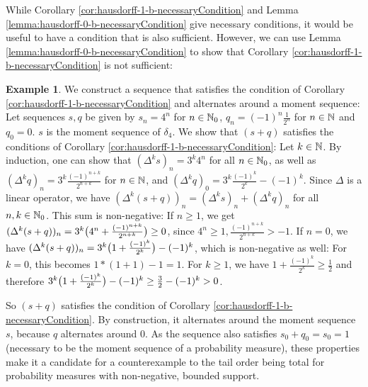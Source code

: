 \documentclass[a4paper,DIV=11]{scrreprt}
\theoremstyle{definition}
\newtheorem{ex}[thm]{Example} %
\begin{document}
    While Corollary \ref{cor:hausdorff-1-b-necessaryCondition} and Lemma \ref{lemma:hausdorff-0-b-necessaryCondition} give necessary conditions, it would be useful to have a condition that is also sufficient. However, we can use Lemma \ref{lemma:hausdorff-0-b-necessaryCondition} to show that Corollary \ref{cor:hausdorff-1-b-necessaryCondition} is not sufficient:
    
    \begin{ex}
        We construct a sequence that satisfies the condition of Corollary \ref{cor:hausdorff-1-b-necessaryCondition} and alternates around a moment sequence:
        Let sequences $s, q$ be given by $s_n = 4^n$ for $n \in \mathbb{N}_0$, $q_n = (-1)^n\frac{1}{2^n}$ for $n \in \mathbb{N}$ and $q_0 = 0$. $s$ is the moment sequence of $\delta_4$. We show that $(s + q)$ satisfies the conditions of Corollary \ref{cor:hausdorff-1-b-necessaryCondition}:
        Let $k \in \mathbb{N}$.
        By induction, one can show that $(\Delta^k s)_n = 3^k 4^n$ for all $n \in \mathbb{N}_0$, as well as $(\Delta^k q)_n = 3^k\frac{(-1)^{n+k}}{2^{n+k}}$ for $n \in \mathbb{N}$, and $(\Delta^k q)_0 = 3^k \frac{(-1)^k}{2^k} - (-1)^k$.
        Since $\Delta$ is a linear operator, we have ${(\Delta^k (s+q))_n} = {(\Delta^k s)_n + (\Delta^k q)_n}$ for all $n, k \in \mathbb{N}_0$. This sum is non-negative:
        If $n \geq 1$, we get $(\Delta^k (s+q))_n = 3^k\bigl(4^n + \frac{(-1)^{n+k}}{2^{n+k}}\bigr) \geq 0$, since $4^n \geq 1, \frac{(-1)^{n+k}}{2^{n+k}} > -1$.
        If $n = 0$, we have ${(\Delta^k (s+q))_n} = {3^k\bigl(1 + \frac{(-1)^{k}}{2^{k}}\bigr) - (-1)^k}$, which is non-negative as well:
        For $k = 0$, this becomes ${1*(1 + 1) - 1 = 1}$.
        For $k \geq 1$, we have $1 + \frac{(-1)^{k}}{2^{k}} \geq \frac{1}{2}$ and therefore $3^k\bigl(1 + \frac{(-1)^{k}}{2^{k}}\bigr) - (-1)^k \geq \frac{3}{2} - (-1)^k > 0$.
        
        
        So $(s+q)$ satisfies the condition of Corollary \ref{cor:hausdorff-1-b-necessaryCondition}. 
        By construction, it alternates around the moment sequence $s$, because $q$ alternates around 0.
        As the sequence also satisfies $s_0 + q_0 = s_0 = 1$ (necessary to be the moment sequence of a probability measure), these properties make it a candidate for a counterexample to the tail order being total for probability measures with non-negative, bounded support. 
        

\end{ex}
\end{document}
